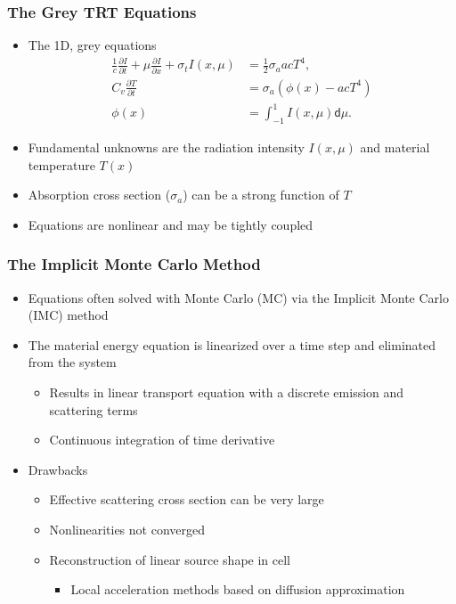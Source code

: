 \documentclass[xcolor=dvipsnames,hyperref={pdfpagelabels=false},handout,unknownkeysallowed]{beamer}
\newlength{\wideitemsep}
\let\olditem\item
\renewcommand{\item}{\setlength{\itemsep}{\wideitemsep}\olditem}
\newcommand{\pderiv}[2]{\frac{\partial #1}{\partial #2}}
\renewcommand{\d}{\mathsf{d}}
\begin{document}
\begin{frame}
\frametitle{The Grey TRT Equations}
\begin{itemize}
\item The 1D, grey equations
\begin{align*}\label{ho_cont}
    \frac{1}{c}\pderiv{I}{t} + \mu \pderiv{I}{x} + \sigma_t I(x,\mu)
&= \frac{1}{2} \sigma_a a c T^4,
  \\
  C_v \pderiv{T}{t} &=  \sigma_a \left(\phi(x) - a c T^4\right) \\
   \phi(x) &= \int_{-1}^1 I(x,\mu) \d \mu.
\end{align*}
        \item Fundamental unknowns are the radiation intensity $I(x,\mu)$ and material
            temperature $T(x)$
        \item \pause Absorption cross section ($\sigma_a$) can be a strong function of $T$
        \item Equations are nonlinear and may be tightly coupled 
\end{itemize}

\end{frame}

\begin{frame}
\frametitle{The Implicit Monte Carlo Method}
\begin{itemize}
\item Equations often solved with Monte Carlo (MC) via the Implicit Monte Carlo (IMC) method
\item The material energy equation is linearized over a time step and eliminated from the system
    \begin{itemize}
        \item Results in linear transport equation with a discrete emission and scattering terms
\item Continuous integration of time derivative
    \end{itemize}
\item Drawbacks 
\begin{itemize}
\item Effective scattering cross section can be very large 
\item Nonlinearities not converged
\item Reconstruction of linear source shape in cell
    \begin{itemize}
        \item Local acceleration methods based on diffusion approximation
    \end{itemize}
\end{itemize}
\end{itemize}
\end{frame}
\end{document}
